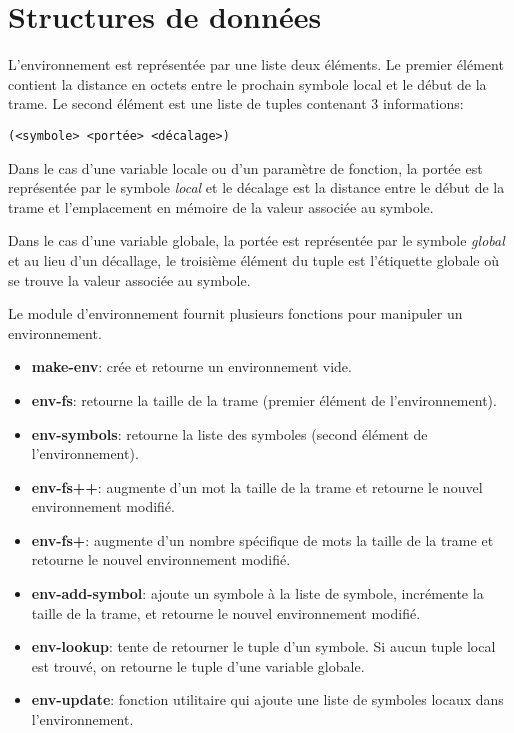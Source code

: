 \documentclass[11pt]{report}
\begin{document}
\section{Structures de données}

L'environnement est représentée par une liste deux éléments. Le
premier élément contient la distance en octets entre le prochain
symbole local et le début de la trame. Le second élément est une liste
de tuples contenant 3 informations:


\begin{verbatim}
(<symbole> <portée> <décalage>)
\end{verbatim}

Dans le cas d'une variable locale ou d'un paramètre de fonction, la
portée est représentée par le symbole {\it local} et le décalage est la
distance entre le début de la trame et l'emplacement en mémoire de la
valeur associée au symbole.

Dans le cas d'une variable globale, la portée est représentée par le
symbole {\it global} et au lieu d'un décallage, le troisième élément
du tuple est l'étiquette globale où se trouve la valeur associée au
symbole.

Le module d'environnement fournit plusieurs fonctions pour manipuler
un environnement.

\begin{itemize}
\item {\bf make-env}: crée et retourne un environnement vide.
\item {\bf env-fs}: retourne la taille de la trame (premier élément de
  l'environnement).
\item {\bf env-symbols}: retourne la liste des symboles (second
  élément de l'environnement).
\item {\bf env-fs++}: augmente d'un mot la taille de la trame et
  retourne le nouvel environnement modifié.
\item {\bf env-fs+}: augmente d'un nombre spécifique de mots la taille
  de la trame et retourne le nouvel environnement modifié.
\item {\bf env-add-symbol}: ajoute un symbole à la liste de symbole,
  incrémente la taille de la trame, et retourne le nouvel
  environnement modifié.
\item {\bf env-lookup}: tente de retourner le tuple d'un symbole. Si
  aucun tuple local est trouvé, on retourne le tuple d'une variable
  globale.
\item {\bf env-update}: fonction utilitaire qui ajoute une liste de
  symboles locaux dans l'environnement.
\end{itemize}
\end{document}
